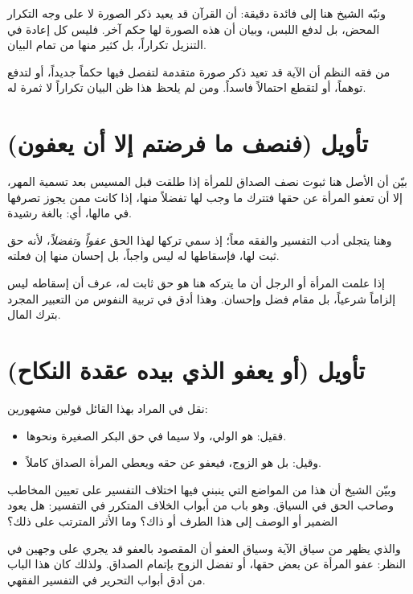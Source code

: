 ونبّه الشيخ هنا إلى فائدة دقيقة: أن القرآن قد يعيد ذكر الصورة لا على وجه التكرار المحض، بل لدفع اللبس، وبيان أن هذه الصورة لها حكم آخر. فليس كل إعادة في التنزيل تكراراً، بل كثير منها من تمام البيان.

\begin{fawaid}
من فقه النظم أن الآية قد تعيد ذكر صورة متقدمة لتفصل فيها حكماً جديداً، أو لتدفع توهماً، أو لتقطع احتمالاً فاسداً. ومن لم يلحظ هذا ظن البيان تكراراً لا ثمرة له.
\end{fawaid}

\section{تأويل (فنصف ما فرضتم إلا أن يعفون)}
بيّن  أن الأصل هنا ثبوت نصف الصداق للمرأة إذا طلقت قبل المسيس بعد تسمية المهر، إلا أن تعفو المرأة عن حقها فتترك ما وجب لها تفضلاً منها، إذا كانت ممن يجوز تصرفها في مالها، أي: بالغة رشيدة.

وهنا يتجلى أدب التفسير والفقه معاً؛ إذ سمي تركها لهذا الحق \textit{عفواً} و\textit{تفضلاً}، لأنه حق ثبت لها، فإسقاطها له ليس واجباً، بل إحسان منها إن فعلته.

\begin{fawaid}
إذا علمت المرأة أو الرجل أن ما يتركه هنا هو حق ثابت له، عرف أن إسقاطه ليس إلزاماً شرعياً، بل مقام فضل وإحسان. وهذا أدق في تربية النفوس من التعبير المجرد بترك المال.
\end{fawaid}

\section{تأويل (أو يعفو الذي بيده عقدة النكاح)}
نقل  في المراد بهذا القائل قولين مشهورين:
\begin{itemize}
    \item فقيل: هو الولي، ولا سيما في حق البكر الصغيرة ونحوها.
    \item وقيل: بل هو الزوج، فيعفو عن حقه ويعطي المرأة الصداق كاملاً.
\end{itemize}

وبيّن الشيخ أن هذا من المواضع التي ينبني فيها اختلاف التفسير على تعيين المخاطب وصاحب الحق في السياق. وهو باب من أبواب الخلاف المتكرر في التفسير: هل يعود الضمير أو الوصف إلى هذا الطرف أو ذاك؟ وما الأثر المترتب على ذلك؟

والذي يظهر من سياق الآية وسياق العفو أن المقصود بالعفو قد يجري على وجهين في النظر: عفو المرأة عن بعض حقها، أو تفضل الزوج بإتمام الصداق. ولذلك كان هذا الباب من أدق أبواب التحرير في التفسير الفقهي.


